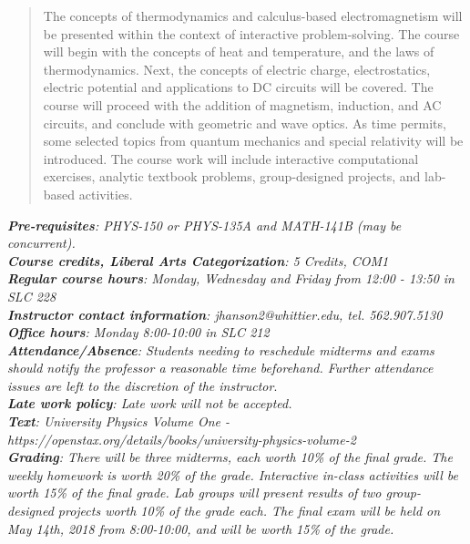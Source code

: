\documentclass[10pt]{article}
\begin{document}
\maketitle

\begin{abstract}
The concepts of thermodynamics and calculus-based electromagnetism will be presented within the context of interactive problem-solving.  The course will begin with the concepts of heat and temperature, and the laws of thermodynamics.  Next, the concepts of electric charge, electrostatics, electric potential and applications to DC circuits will be covered.  The course will proceed with the addition of magnetism, induction, and AC circuits, and conclude with geometric and wave optics.  As time permits, some selected topics from quantum mechanics and special relativity will be introduced.  The course work will include interactive computational exercises, analytic textbook problems, group-designed projects, and lab-based activities.
\end{abstract}
\noindent
\textit{\textbf{Pre-requisites}: PHYS-150 or PHYS-135A and MATH-141B (may be concurrent).} \\
\textit{\textbf{Course credits, Liberal Arts Categorization}: 5 Credits, COM1} \\
\textit{\textbf{Regular course hours}: Monday, Wednesday and Friday from 12:00 - 13:50 in SLC 228} \\
\textit{\textbf{Instructor contact information}: jhanson2@whittier.edu, tel. 562.907.5130} \\
\textit{\textbf{Office hours}: Monday 8:00-10:00 in SLC 212} \\
\textit{\textbf{Attendance/Absence}: Students needing to reschedule midterms and exams should notify the professor a reasonable time beforehand. Further attendance issues are left to the discretion of the instructor}.\\ 
\textit{\textbf{Late work policy}: Late work will not be accepted.} \\
\textit{\textbf{Text}: University Physics Volume One - https://openstax.org/details/books/university-physics-volume-2} \\
\textit{\textbf{Grading}: There will be three midterms, each worth 10\% of the final grade.  The weekly homework is worth 20\% of the grade.  Interactive in-class activities will be worth 15\% of the final grade.  Lab groups will present results of two group-designed projects worth 10\% of the grade each.  The final exam will be held on May 14th, 2018 from 8:00-10:00, and will be worth 15\% of the grade.} \\
\end{document}
